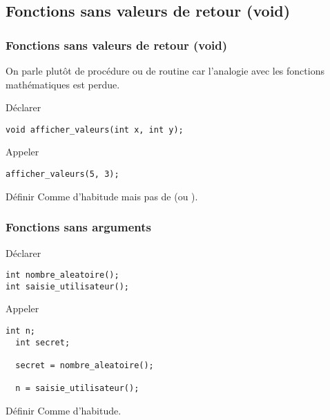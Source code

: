\documentclass[xcolor=pdftex,svgnames,table]{beamer}
\begin{document}
\subsection[Procédures]{Fonctions sans valeurs de retour (void)}
\begin{frame}[fragile]
  \frametitle{Fonctions sans valeurs de retour (void)}

On parle plutôt de procédure ou de routine car l'analogie avec les
fonctions mathématiques est perdue.

 \begin{block}{Déclarer}
    \begin{lstlisting}[basicstyle=\ttfamily\small]
void afficher_valeurs(int x, int y);
     \end{lstlisting}
  \end{block}

  \begin{block}{Appeler}
  \begin{lstlisting}[basicstyle=\ttfamily\small]
afficher_valeurs(5, 3);
   \end{lstlisting}
  \end{block}

  \begin{block}{Définir}
Comme d'habitude mais pas de  (ou ).
\end{block}
\end{frame}

\begin{frame}[fragile]
  \frametitle{Fonctions sans arguments}

 \begin{block}{Déclarer}
    \begin{lstlisting}[basicstyle=\ttfamily\small]
int nombre_aleatoire();
int saisie_utilisateur();
     \end{lstlisting}
  \end{block}

  \begin{block}{Appeler}
  \begin{lstlisting}[basicstyle=\ttfamily\small]
  int n;
  int secret;

  secret = nombre_aleatoire();

  n = saisie_utilisateur();
   \end{lstlisting}
  \end{block}

  \begin{block}{Définir}
Comme d'habitude.
\end{block}
\end{frame}
\end{document}
